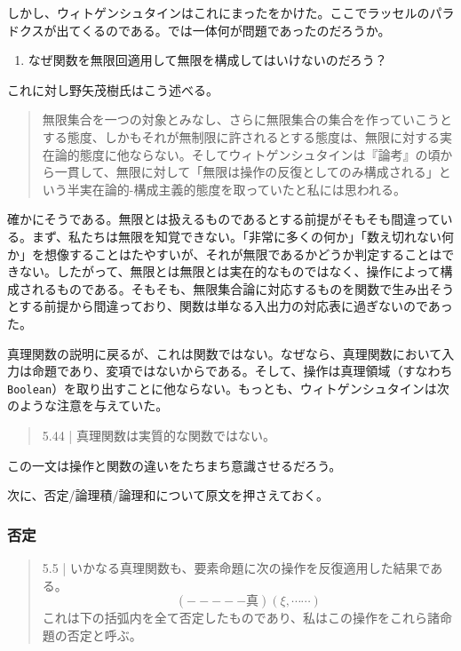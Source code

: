 \documentclass[11pt,a4paper,onecolumn,article]{jarticle}
\newcounter{ct}               %
\begin{document}
しかし、ウィトゲンシュタインはこれにまったをかけた。ここでラッセルのパラドクスが出てくるのである。では一体何が問題であったのだろうか。

\begin{enumerate}
  \item なぜ関数を無限回適用して無限を構成してはいけないのだろう？
\end{enumerate}
これに対し野矢茂樹氏はこう述べる。

\begin{quotation}
   無限集合を一つの対象とみなし、さらに無限集合の集合を作っていこうとする態度、しかもそれが無制限に許されるとする態度は、無限に対する実在論的態度に他ならない。そしてウィトゲンシュタインは『論考』の頃から一貫して、無限に対して「無限は操作の反復としてのみ構成される」という半実在論的-構成主義的態度を取っていたと私には思われる。
\end{quotation}

確かにそうである。無限とは扱えるものであるとする前提がそもそも間違っている。まず、私たちは無限を知覚できない。「非常に多くの何か」「数え切れない何か」を想像することはたやすいが、それが無限であるかどうか判定することはできない。したがって、無限とは無限とは実在的なものではなく、操作によって構成されるものである。そもそも、無限集合論に対応するものを関数で生み出そうとする前提から間違っており、関数は単なる入出力の対応表に過ぎないのであった。

真理関数の説明に戻るが、これは関数ではない。なぜなら、真理関数において入力は命題であり、変項ではないからである。そして、操作は真理領域（すなわち\texttt{Boolean}）を取り出すことに他ならない。もっとも、ウィトゲンシュタインは次のような注意を与えていた。

\begin{quote}
  5.44 | 真理関数は実質的な関数ではない。
\end{quote}

この一文は操作と関数の違いをたちまち意識させるだろう。

次に、否定/論理積/論理和について原文を押さえておく。

\subsubsection{否定}

\begin{quote}
  5.5 | いかなる真理関数も、要素命題に次の操作を反復適用した結果である。
  \[ (-----真)(\xi, \cdots \cdots) \]
  これは下の括弧内を全て否定したものであり、私はこの操作をこれら諸命題の否定と呼ぶ。
\end{quote}
\end{document}
